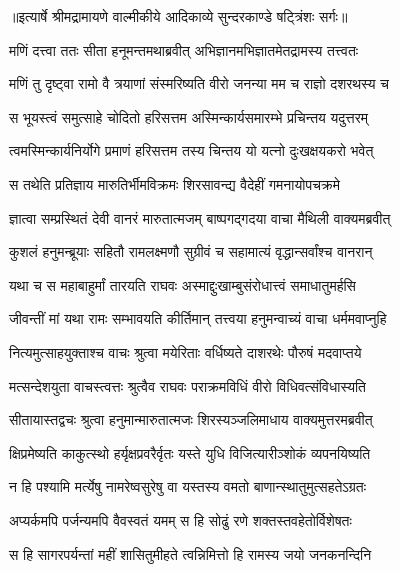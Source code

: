 {॥इत्यार्षे श्रीमद्रामायणे वाल्मीकीये आदिकाव्ये सुन्दरकाण्डे षट्त्रिंशः सर्गः॥}


\twolineshloka
{मणिं दत्त्वा ततः सीता हनूमन्तमथाब्रवीत्}
{अभिज्ञानमभिज्ञातमेतद्रामस्य तत्त्वतः} %

\twolineshloka
{मणिं तु दृष्ट्वा रामो वै त्रयाणां संस्मरिष्यति}
{वीरो जनन्या मम च राज्ञो दशरथस्य च} %

\twolineshloka
{स भूयस्त्वं समुत्साहे चोदितो हरिसत्तम}
{अस्मिन्कार्यसमारम्भे प्रचिन्तय यदुत्तरम्} %

\twolineshloka
{त्वमस्मिन्कार्यनिर्योगे प्रमाणं हरिसत्तम}
{तस्य चिन्तय यो यत्नो दुःखक्षयकरो भवेत्} %

\twolineshloka
{स तथेति प्रतिज्ञाय मारुतिर्भीमविक्रमः}
{शिरसावन्द्य वैदेहीं गमनायोपचक्रमे} %

\twolineshloka
{ज्ञात्वा सम्प्रस्थितं देवी वानरं मारुतात्मजम्}
{बाष्पगद्गदया वाचा मैथिली वाक्यमब्रवीत्} %

\twolineshloka
{कुशलं हनुमन्ब्रूयाः सहितौ रामलक्ष्मणौ}
{सुग्रीवं च सहामात्यं वृद्धान्सर्वांश्च वानरान्} %

\twolineshloka
{यथा च स महाबाहुर्मां तारयति राघवः}
{अस्माद्दुःखाम्बुसंरोधात्त्वं समाधातुमर्हसि} %

\twolineshloka
{जीवन्तीं मां यथा रामः सम्भावयति कीर्तिमान्}
{तत्त्वया हनुमन्वाच्यं वाचा धर्ममवाप्नुहि} %

\twolineshloka
{नित्यमुत्साहयुक्ताश्च वाचः श्रुत्वा मयेरिताः}
{वर्धिष्यते दाशरथेः पौरुषं मदवाप्तये} %

\twolineshloka
{मत्सन्देशयुता वाचस्त्वत्तः श्रुत्वैव राघवः}
{पराक्रमविधिं वीरो विधिवत्संविधास्यति} %

\twolineshloka
{सीतायास्तद्वचः श्रुत्वा हनुमान्मारुतात्मजः}
{शिरस्यञ्जलिमाधाय वाक्यमुत्तरमब्रवीत्} %

\twolineshloka
{क्षिप्रमेष्यति काकुत्स्थो हर्यृक्षप्रवरैर्वृतः}
{यस्ते युधि विजित्यारीञ्शोकं व्यपनयिष्यति} %

\twolineshloka
{न हि पश्यामि मर्त्येषु नामरेष्वसुरेषु वा}
{यस्तस्य वमतो बाणान्स्थातुमुत्सहतेऽग्रतः} %

\twolineshloka
{अप्यर्कमपि पर्जन्यमपि वैवस्वतं यमम्}
{स हि सोढुं रणे शक्तस्तवहेतोर्विशेषतः} %

\twolineshloka
{स हि सागरपर्यन्तां महीं शासितुमीहते}
{त्वन्निमित्तो हि रामस्य जयो जनकनन्दिनि} %

